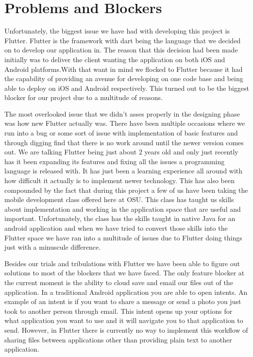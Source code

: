 \documentclass[onecolumn, draftclsnofoot,10pt, compsoc]{IEEEtran}
\begin{document}
\section{Problems and Blockers}
Unfortunately, the biggest issue we have had with developing this project is Flutter. Flutter is the framework with dart being the language that we decided on to develop our application in. The reason that this decision had been made initially was to deliver the client wanting the application on both iOS and Android platforms.With that want in mind we flocked to Flutter because it had the capability of providing an avenue for developing on one code base and being able to deploy on iOS and Android respectively. This turned out to be the biggest blocker for our project due to a multitude of reasons. \par 
The most overlooked issue that we didn't asses properly in the designing phase was how new Flutter actually was. There have been multiple occasions where we run into a bug or some sort of issue with implementation of basic features and through digging find that there is no work around until the newer version comes out. We are talking Flutter being just about 2 years old and only just recently has it been expanding its features and fixing all the issues a programming language is released with. It has just been a learning experience all around with how difficult it actually is to implement newer technology. This has also been compounded by the fact that during this project a few of us have been taking the mobile development class offered here at OSU. This class has taught us skills about implementation and working in the application space that are useful and important. Unfortunately, the class has the skills taught in native Java for an android application and when we have tried to convert those skills into the Flutter space we have ran into a multitude of issues due to Flutter doing things just with a minuscule difference. \par 
Besides our trials and tribulations with Flutter we have been able to figure out solutions to most of the blockers that we have faced. The only feature blocker at the current moment is the ability to cloud save and email our files out of the application. In a traditional Android application you are able to open intents. An example of an intent is if you want to share a message or send a photo you just took to another person through email. This intent opens up your options for what application you want to use and it will navigate you to that application to send. However, in Flutter there is currently no way to implement this workflow of sharing files between applications other than providing plain text to another application. \par 
\end{document}
